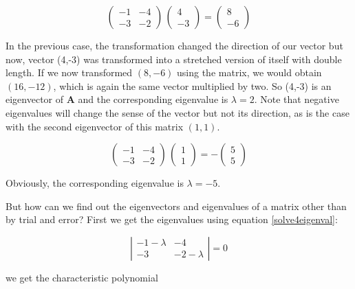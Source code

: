\documentclass[12pt]{article}
\begin{document}
\begin{equation}
	\begin{pmatrix} -1 & -4\\ -3 & -2\end{pmatrix} \,  \begin{pmatrix} 4\\ -3\end{pmatrix}=\begin{pmatrix} 8 \\ -6\end{pmatrix}\nonumber
\end{equation}

In the previous case, the transformation changed the direction of our vector but now, vector (4,-3) was transformed into a stretched version of itself with double length. If we now transformed $(8,-6)$ using the matrix, we would obtain $(16,-12)$, which is again the same vector multiplied by two. So (4,-3) is an eigenvector of $\mathbf{A}$ and the corresponding eigenvalue is $\lambda=2$. Note that negative eigenvalues will change the sense of the vector but not its direction, as is the case with the second eigenvector of this matrix $(1,1)$.

\begin{equation}
	\begin{pmatrix} -1 & -4\\ -3 & -2\end{pmatrix} \,  \begin{pmatrix} 1\\ 1\end{pmatrix}=- \begin{pmatrix} 5 \\ 5\end{pmatrix}\nonumber
\end{equation}

Obviously, the corresponding eigenvalue is $\lambda=-5$.

But how can we find out the eigenvectors and eigenvalues of a matrix other than by trial and error? First we get the eigenvalues using equation \ref{solve4eigenval}:

\begin{equation}
  \left|\begin{matrix} -1-\lambda & -4\\ -3 & -2-\lambda\end{matrix} \right| = 0 \nonumber
\end{equation}

we get the characteristic polynomial
\end{document}
